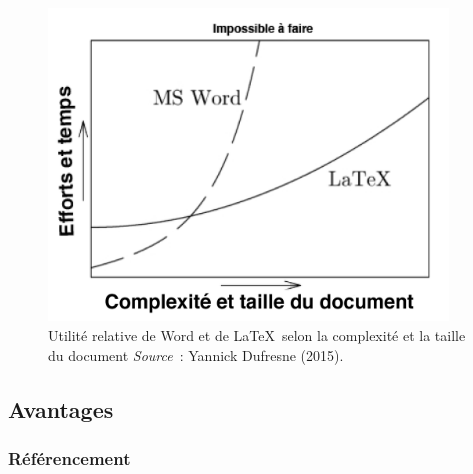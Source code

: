 \documentclass[
  letterpaper,
]{scrbook}
\begin{document}
\begin{figure}

{\centering \includegraphics[width=4.18in,height=\textheight]{images/chapitre5_word-vs-latex.png}

}

\caption{\label{fig-latex-vs-word}Utilité relative de Word et de
\LaTeX~selon la complexité et la taille du document
\newline \textit{Source}~: Yannick Dufresne (2015).}

\end{figure}

\hypertarget{avantages-1}{%
\subsection{Avantages}\label{avantages-1}}

\hypertarget{ruxe9fuxe9rencement}{%
\subsubsection{Référencement}\label{ruxe9fuxe9rencement}}
\end{document}

